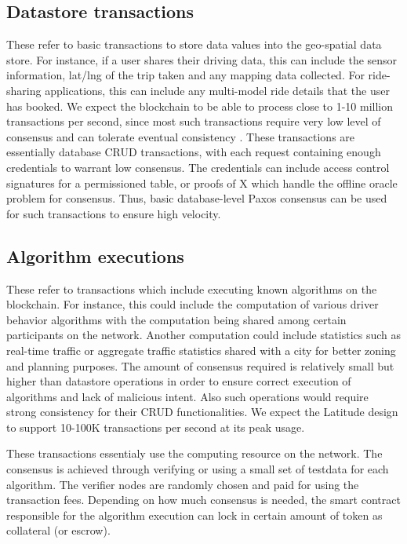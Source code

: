 \subsection{Datastore transactions}
These refer to basic transactions to store data values into the geo-spatial data
store. For instance, if a user shares their driving data, this can include the sensor information, lat/lng of the trip
taken and any mapping data collected. For ride-sharing applications, this can include any multi-model ride details that
the user has booked. We expect the blockchain to be able to process close to 1-10 million transactions per second, since
most such transactions require very low level of consensus and can tolerate eventual consistency \cite{eventual_con}.
These transactions are essentially database CRUD transactions, with each request containing enough credentials to
warrant low consensus. The credentials can include access control signatures for a permissioned table, or proofs of X
which handle the offline oracle problem for consensus. Thus, basic database-level Paxos consensus can be used for such
transactions to ensure high velocity. 

\subsection{Algorithm executions}
These refer to transactions which include executing known algorithms on the blockchain. For instance, this could include
the computation of various driver behavior algorithms with the computation being shared among certain participants on
the network. Another computation could include statistics such as real-time traffic or aggregate traffic statistics
shared with a city for better zoning and planning purposes. The amount of consensus required is relatively small but
higher than datastore operations in order to ensure correct execution of algorithms and lack of malicious intent. Also
such operations would require strong consistency for their CRUD functionalities. We expect the Latitude design to
support 10-100K transactions per second at its peak usage.

These transactions essentialy use the computing resource on the network. The consensus is achieved through verifying or
using a small set of testdata for each algorithm. The verifier nodes are randomly chosen and paid for using the
transaction fees. Depending on how much consensus is needed, the smart contract responsible for the algorithm execution
can lock in certain amount of token as collateral (or escrow).

